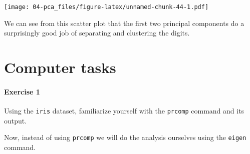 \documentclass[
]{book}
\newenvironment{Shaded}{\begin{snugshade}}{\end{snugshade}}
\newcommand{\AttributeTok}[1]{\textcolor[rgb]{0.13,0.29,0.53}{#1}}
\newcommand{\CommentTok}[1]{\textcolor[rgb]{0.56,0.35,0.01}{\textit{#1}}}
\newcommand{\DecValTok}[1]{\textcolor[rgb]{0.00,0.00,0.81}{#1}}
\newcommand{\FunctionTok}[1]{\textcolor[rgb]{0.13,0.29,0.53}{\textbf{#1}}}
\newcommand{\NormalTok}[1]{#1}
\newcommand{\OtherTok}[1]{\textcolor[rgb]{0.56,0.35,0.01}{#1}}
\newcommand{\SpecialCharTok}[1]{\textcolor[rgb]{0.81,0.36,0.00}{\textbf{#1}}}
\theoremstyle{definition}
\theoremstyle{definition}
\theoremstyle{definition}
\theoremstyle{definition}
\theoremstyle{remark}
\begin{document}
\begin{Shaded}
\end{Shaded}

\texttt{[image: 04-pca\_files/figure-latex/unnamed-chunk-44-1.pdf]}

We can see from this scatter plot that the first two principal components do a surprisingly good job of separating and clustering the digits.

\hypertarget{pca-comptask}{%
\section{Computer tasks}\label{pca-comptask}}

\hypertarget{exercise-1}{%
\paragraph*{Exercise 1}\label{exercise-1}}

Using the \texttt{iris} dataset, familiarize yourself with the \texttt{prcomp} command and its output.

Now, instead of using \texttt{prcomp} we will do the analysis ourselves using the \texttt{eigen} command.
\end{document}
